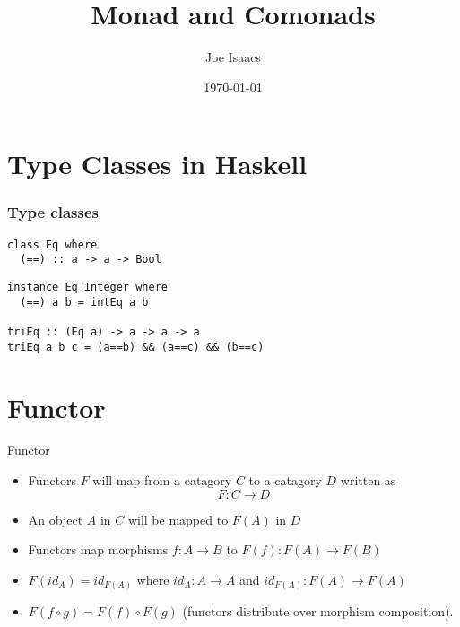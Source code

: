 \documentclass{beamer} %
\author{Joe Isaacs}
\title{Monad and Comonads}
\institute{Churchill CompSci talks}
\date{\today}
\begin{document}
\begin{frame}
  \titlepage
\end{frame}

\section{Type Classes in Haskell}

\begin{frame}[fragile]\frametitle{Type classes}
\begin{verbatim}
class Eq where
  (==) :: a -> a -> Bool
\end{verbatim}

\begin{verbatim}
instance Eq Integer where
  (==) a b = intEq a b

triEq :: (Eq a) -> a -> a -> a
triEq a b c = (a==b) && (a==c) && (b==c)
\end{verbatim}
\end{frame}

\section{Functor}

\begin{frame}{Functor}
  \begin{itemize}
    \item Functors $F$ will map from a catagory $C$ to a catagory $D$ written as 
      \[ F : C \rightarrow D \]

    \item An object $A$ in $C$ will be mapped to $F(A)$ in $D$

    \item Functors map morphisms $f : A \rightarrow B$ to $F(f) : F(A) \rightarrow F(B)$

    \item $F(id_A) = id_{F(A)}$ where $id_A : A \rightarrow A$ and 
      $id_{F(A)} : F(A) \rightarrow F(A)$

    \item $F(f \circ g) = F(f) \circ F(g) $ (functors distribute over morphism composition).
  \end{itemize}
\end{frame}
\end{document}
